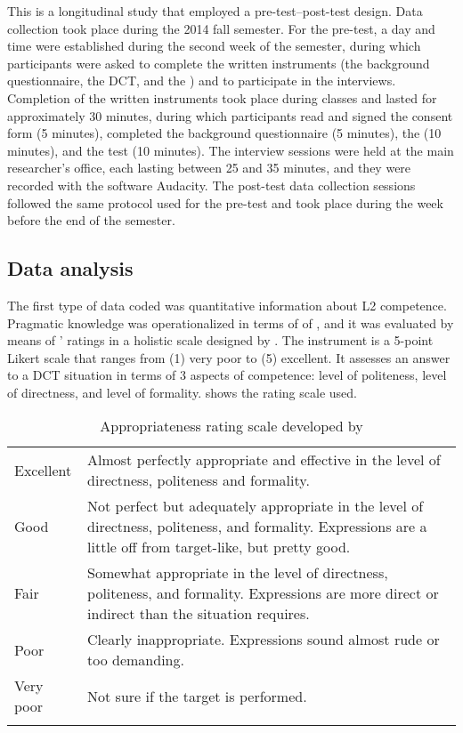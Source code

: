 \documentclass[output=paper]{langsci/langscibook}
\begin{document}
This is a longitudinal study that employed a pre-test–post-test design. Data collection took place during the 2014 fall semester. For the pre-test, a day and time were established during the second week of the semester, during which participants were asked to complete the written instruments (the background questionnaire, the DCT, and the ) and to participate in the interviews. Completion of the written instruments took place during   classes and lasted for approximately 30 minutes, during which participants read and signed the consent form (5 minutes), completed the background questionnaire (5 minutes), the  (10 minutes), and the  test (10 minutes). The interview sessions were held at the main researcher’s office, each lasting between 25 and 35 minutes, and they were recorded with the software Audacity. The post-test data collection sessions followed the same protocol used for the pre-test and took place during the week before the end of the semester.


\subsection{Data analysis}
\largerpage
The first type of data coded was quantitative information about L2 competence. Pragmatic knowledge was operationalized in terms of  of , and it was evaluated by means of ’ ratings in a holistic  scale designed by \citet{Taguchi2011}. The instrument is a 5-point Likert scale that ranges from (1) very poor to (5) excellent. It assesses an answer to a DCT situation in terms of 3 aspects of  competence: level of politeness, level of directness, and level of formality.  shows the rating scale used.


\begin{table}
\caption{Appropriateness rating scale developed by \citet[459]{Taguchi2011}}
\label{tab:sanchez:3}

\begin{tabularx}{\textwidth}{lQ}
\lsptoprule 
Excellent & Almost perfectly appropriate and effective in the level of directness, politeness and formality.\\
Good & Not perfect but adequately appropriate in the level of directness, politeness, and formality. Expressions are a little off from target-like, but pretty good.\\
Fair & Somewhat appropriate in the level of directness, politeness, and formality. Expressions are more direct or indirect than the situation requires.\\
Poor & Clearly inappropriate. Expressions sound almost rude or too demanding.\\
Very poor & Not sure if the target  is performed.\\
\lspbottomrule
\end{tabularx}
\end{table}
\end{document}
